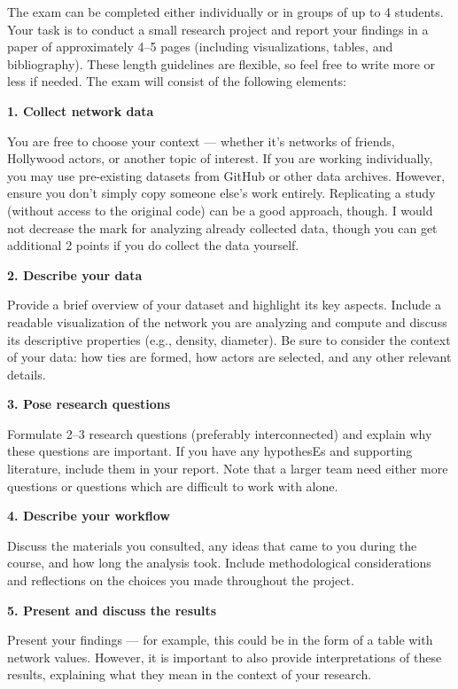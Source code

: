 \documentclass[
]{book}
\begin{document}
The exam can be completed either individually or in groups of up to 4 students. Your task is to conduct a small research project and report your findings in a paper of approximately 4--5 pages (including visualizations, tables, and bibliography). These length guidelines are flexible, so feel free to write more or less if needed. The exam will consist of the following elements:

\textbf{1. Collect network data}

You are free to choose your context --- whether it's networks of friends, Hollywood actors, or another topic of interest. If you are working individually, you may use pre-existing datasets from GitHub or other data archives. However, ensure you don't simply copy someone else's work entirely. Replicating a study (without access to the original code) can be a good approach, though. I would not decrease the mark for analyzing already collected data, though you can get additional 2 points if you do collect the data yourself.

\textbf{2. Describe your data}

Provide a brief overview of your dataset and highlight its key aspects. Include a readable visualization of the network you are analyzing and compute and discuss its descriptive properties (e.g., density, diameter). Be sure to consider the context of your data: how ties are formed, how actors are selected, and any other relevant details.

\textbf{3. Pose research questions}

Formulate 2--3 research questions (preferably interconnected) and explain why these questions are important. If you have any hypothesEs and supporting literature, include them in your report. Note that a larger team need either more questions or questions which are difficult to work with alone.

\textbf{4. Describe your workflow}

Discuss the materials you consulted, any ideas that came to you during the course, and how long the analysis took. Include methodological considerations and reflections on the choices you made throughout the project.

\textbf{5. Present and discuss the results}

Present your findings --- for example, this could be in the form of a table with network values. However, it is important to also provide interpretations of these results, explaining what they mean in the context of your research.
\end{document}
